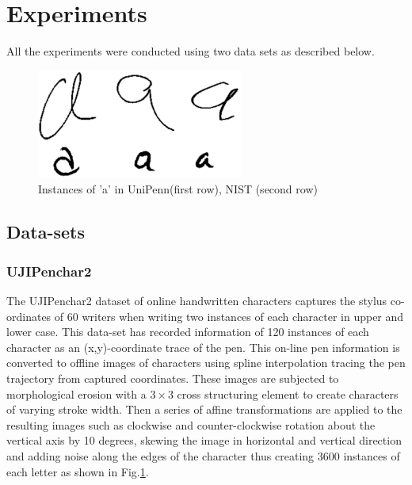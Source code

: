 \documentclass[runningheads]{llncs}
\begin{document}
\section{Experiments}
All the experiments were conducted using two data sets as described below.
\label{sec:exp}
\begin{figure}[t]

\begin{minipage}[b]{1.0\linewidth}
  \centering
  \centerline{\includegraphics[width=6.8cm,height=3.6cm]{data}}
\end{minipage}
\caption{Instances of 'a' in UniPenn(first row), NIST (second row)}
\label{fig:dataset}
%
\end{figure}

\subsection{Data-sets}
\label{ssec:data}
\subsubsection{UJIPenchar2}
The UJIPenchar2 dataset of online handwritten characters \cite{UJIPen} captures the stylus co-ordinates of 60 writers when writing two instances of each character in upper and lower case. This data-set has recorded information of 120 instances of each character as an (x,y)-coordinate trace of the pen. This on-line pen information is converted to offline images of characters using spline interpolation tracing the pen trajectory from captured coordinates. These images are subjected to  morphological erosion with a $3\times3$ cross structuring element to create characters of varying stroke width. Then a series of affine transformations are applied to the resulting images such as clockwise and counter-clockwise rotation about the vertical axis by 10 degrees, skewing the image in horizontal and vertical direction and adding noise along the edges of the character thus creating 3600 instances of each letter as shown in Fig.\ref{fig:dataset}.
\end{document}
